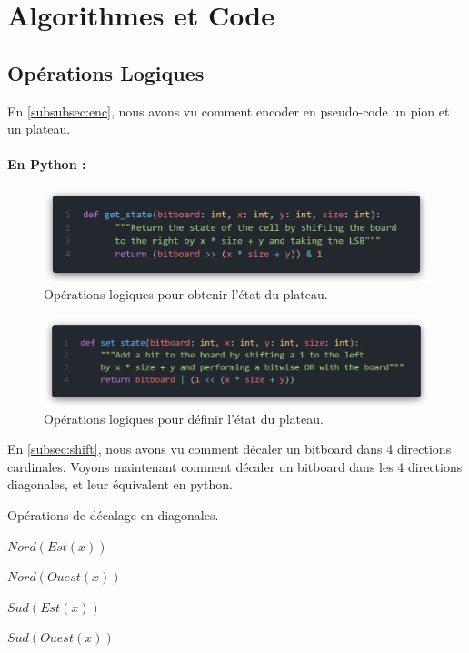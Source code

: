 \appendix
{}
\renewcommand{\thepage}{\Roman{page}}

\chapter{Algorithmes et Code}

\section{Opérations Logiques}
\label{app:logical_ops}
En \ref{subsubsec:enc}, nous avons vu comment encoder en pseudo-code un pion et un plateau.
\\ \\
\noindent \textbf{En Python :}
\begin{figure}[H]
    \centering
    \includegraphics[width=1\textwidth]{ressources/get_state.png}
    \caption{Opérations logiques pour obtenir l'état du plateau.}
    \label{fig:get_state}
\end{figure}
\begin{figure}[H]
    \centering
    \includegraphics[width=1\textwidth]{ressources/set_state.png}
    \caption{Opérations logiques pour définir l'état du plateau.}
    \label{fig:set_state}
\end{figure}

En \ref{subsec:shift}, nous avons vu comment décaler un bitboard dans 4 directions cardinales. Voyons maintenant comment décaler un bitboard dans les 4 directions diagonales, et leur équivalent en python.

\begin{algorithm}[H]
    \caption{Opérations de décalage en diagonales.}
    \begin{algorithmic}[1]
        \State \Return $Nord(Est(x))$
    \EndFunction

        \State \Return $Nord(Ouest(x))$
    \EndFunction

        \State \Return $Sud(Est(x))$
    \EndFunction

        \State \Return $Sud(Ouest(x))$
    \EndFunction
    \end{algorithmic}
\end{algorithm}

